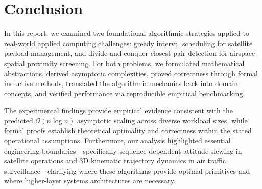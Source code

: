 \section{Conclusion}
In this report, we examined two foundational algorithmic strategies applied to real-world applied computing challenges: greedy interval scheduling for satellite payload management, and divide-and-conquer closest-pair detection for airspace spatial proximity screening. For both problems, we formulated mathematical abstractions, derived asymptotic complexities, proved correctness through formal inductive methods, translated the algorithmic mechanics back into domain concepts, and verified performance via reproducible empirical benchmarking. 

The experimental findings provide empirical evidence consistent with the predicted $\mathcal{O}(n \log n)$ asymptotic scaling across diverse workload sizes, while formal proofs establish theoretical optimality and correctness within the stated operational assumptions. Furthermore, our analysis highlighted essential engineering boundaries---specifically sequence-dependent attitude slewing in satellite operations and 3D kinematic trajectory dynamics in air traffic surveillance---clarifying where these algorithms provide optimal primitives and where higher-layer systems architectures are necessary.
